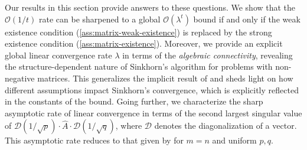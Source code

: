 Our results in this section provide answers to these questions. We show that the $\mathcal O(1/t)$ rate can be sharpened to a global $\mathcal O(\lambda^t)$ bound if and only if the weak existence condition (\cref{ass:matrix-weak-existence}) is replaced by the strong existence condition (\cref{ass:matrix-existence}). Moreover, we provide an explicit global linear convergence rate $\lambda$ in terms of the \emph{algebraic connectivity}, revealing the structure-dependent nature of Sinkhorn's algorithm for problems with non-negative matrices. This generalizes the implicit result of \citet{luo1992convergence} and sheds light on how different assumptions impact Sinkhorn's convergence, which is explicitly reflected in the constants of the bound. Going further, we characterize the sharp asymptotic rate of linear convergence in terms of the second largest singular value of $\mathcal{D}(1/\sqrt{p})\cdot\hat{A}\cdot\mathcal{D}(1/\sqrt{q})$, where $\mathcal{D}$ denotes the diagonalization of a vector. This asymptotic rate reduces to that given by \citet{knight2008sinkhorn} for $m=n$ and uniform $p,q$.


